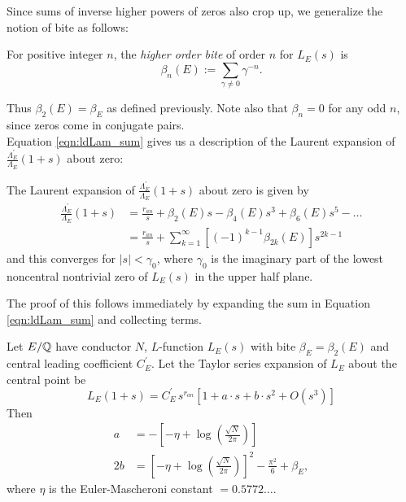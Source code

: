 \documentclass[10pt]{article}
\newcommand{\pr}{^{\prime}}
\newcommand{\Les}{L_E(s)}
\newcommand{\ldLam}[1]{\frac{\Lambda_E\pr}{\Lambda_E}\left(#1\right)}
\begin{document}
Since sums of inverse higher powers of zeros also crop up, we generalize the notion of bite as follows:
\begin{definition}
For positive integer $n$, the {\it higher order bite} of order $n$ for $\Les$ is
\begin{equation}
\beta_n(E) := \sum_{\gamma \ne 0} \gamma^{-n}.
\end{equation}
\end{definition}
Thus $\beta_2(E) = \beta_E$ as defined previously. Note also that $\beta_n = 0$ for any odd $n$, since zeros come in conjugate pairs. \\

Equation \ref{eqn:ldLam_sum} gives us a description of the Laurent expansion of $\ldLam{1+s}$ about zero:
\begin{corollary}\label{cor:ldLam_series_at_zero}
The Laurent expansion of $\ldLam{1+s}$ about zero is given by
\begin{align}
\ldLam{1+s} &= \frac{r_{an}}{s} + \beta_2(E) s - \beta_4(E) s^3 + \beta_6(E) s^5 - \ldots \\
& = \frac{r_{an}}{s} + \sum_{k=1}^{\infty} \left[(-1)^{k-1}\beta_{2k}(E)\right] s^{2k-1}
\end{align}
and this converges for $|s|<\gamma_0$, where $\gamma_0$ is the imaginary part of the lowest noncentral nontrivial zero of $\Les$ in the upper half plane.
\end{corollary}
The proof of this follows immediately by expanding the sum in Equation \ref{eqn:ldLam_sum} and collecting terms. \\

\begin{corollary}\label{cor:ldLe_expansion}
Let $E/\mathbb{Q}$ have conductor $N$, $L$-function $\Les$ with bite $\beta_E = \beta_2(E)$ and central leading coefficient $C_E\pr$. Let the Taylor series expansion of $L_E$ about the central point be
\begin{equation}
L_E(1+s) = C_E\pr \, s^{r_{an}}\left[1 + a\cdot s + b\cdot s^2 + O(s^3)\right]
\end{equation}
Then 
\begin{align}
a &= -\left[-\eta + \log\left(\frac{\sqrt{N}}{2\pi}\right)\right] \\
2b &= \left[-\eta + \log\left(\frac{\sqrt{N}}{2\pi}\right)\right]^2 - \frac{\pi^2}{6} + \beta_E,
\end{align}
where $\eta$ is the Euler-Mascheroni constant $= 0.5772\ldots$.
\end{corollary}
\end{document}
